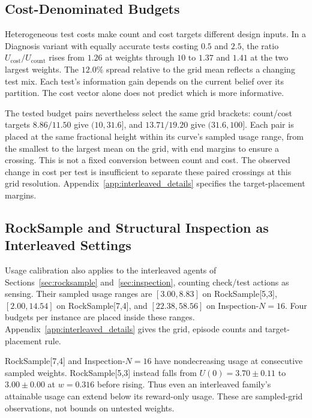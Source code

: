 \documentclass[runningheads]{llncs}
\begin{document}
\subsection{Cost-Denominated Budgets}
\label{sec:cost_budget}

Heterogeneous test costs make count and cost targets different design inputs. In a Diagnosis variant with equally accurate tests costing $0.5$ and $2.5$, the ratio $U_{\mathrm{cost}}/U_{\mathrm{count}}$ rises from $1.26$ at weights through $10$ to $1.37$ and $1.41$ at the two largest weights. The $12.0\%$ spread relative to the grid mean reflects a changing test mix. Each test's information gain depends on the current belief over its partition. The cost vector alone does not predict which is more informative.

The tested budget pairs nevertheless select the same grid brackets: count/cost targets $8.86/11.50$ give $(10,31.6]$, and $13.71/19.20$ give $(31.6,100]$. Each pair is placed at the same fractional height within its curve's sampled usage range, from the smallest to the largest mean on the grid, with end margins to ensure a crossing. This is not a fixed conversion between count and cost. The observed change in cost per test is insufficient to separate these paired crossings at this grid resolution. Appendix~\ref{app:interleaved_details} specifies the target-placement margins.

\subsection{RockSample and Structural Inspection as Interleaved Settings}
\label{sec:interleaved_budget}

Usage calibration also applies to the interleaved agents of Sections~\ref{sec:rocksample} and~\ref{sec:inspection}, counting check/test actions as sensing. Their sampled usage ranges are $[3.00,8.83]$ on RockSample[5,3], $[2.00,14.54]$ on RockSample[7,4], and $[22.38,58.56]$ on Inspection-$N=16$. Four budgets per instance are placed inside these ranges. Appendix~\ref{app:interleaved_details} gives the grid, episode counts and target-placement rule.

RockSample[7,4] and Inspection-$N=16$ have nondecreasing usage at consecutive sampled weights. RockSample[5,3] instead falls from $U(0)=3.70\pm0.11$ to $3.00\pm0.00$ at $w=0.316$ before rising. Thus even an interleaved family's attainable usage can extend below its reward-only usage. These are sampled-grid observations, not bounds on untested weights.
\end{document}
